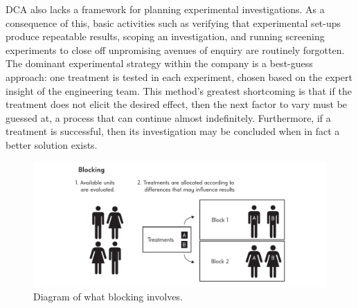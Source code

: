 \documentclass[11pt,a4paper,article]{memoir} %
\begin{document}
\par
DCA also lacks a framework for planning experimental investigations. As a consequence of this, basic activities such as verifying that experimental set-ups produce repeatable results, scoping an investigation, and running screening experiments to close off unpromising avenues of enquiry are routinely forgotten. The dominant experimental strategy within the company is a best-guess approach: one treatment is tested in each experiment, chosen based on the expert insight of the engineering team. This method's greatest shortcoming is that if the treatment does not elicit the desired effect, then the next factor to vary must be guessed at, a process that can continue almost indefinitely. Furthermore, if a treatment is successful, then its investigation may be concluded when in fact a better solution exists.
\par
\begin{figure}
\includegraphics[width=\textwidth]{Blocking.pdf}
\caption{Diagram of what blocking involves.}
\label{fig:blocking}
\end{figure}
\par
\end{document}
